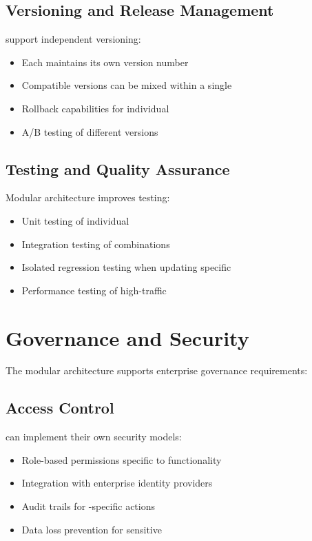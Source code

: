 \subsection{Versioning and Release Management}

 support independent versioning:
\begin{itemize}
\item Each \webbaselet{} maintains its own version number
\item Compatible versions can be mixed within a single \webbase{}
\item Rollback capabilities for individual 
\item A/B testing of different \webbaselet{} versions
\end{itemize}

\subsection{Testing and Quality Assurance}

Modular architecture improves testing:
\begin{itemize}
\item Unit testing of individual 
\item Integration testing of \webbaselet{} combinations
\item Isolated regression testing when updating specific 
\item Performance testing of high-traffic 
\end{itemize}

\section{Governance and Security}
\label{sec:governance-security}

The modular architecture supports enterprise governance requirements:

\subsection{Access Control}

 can implement their own security models:
\begin{itemize}
\item Role-based permissions specific to \webbaselet{} functionality
\item Integration with enterprise identity providers
\item Audit trails for \webbaselet{}-specific actions
\item Data loss prevention for sensitive 
\end{itemize}

